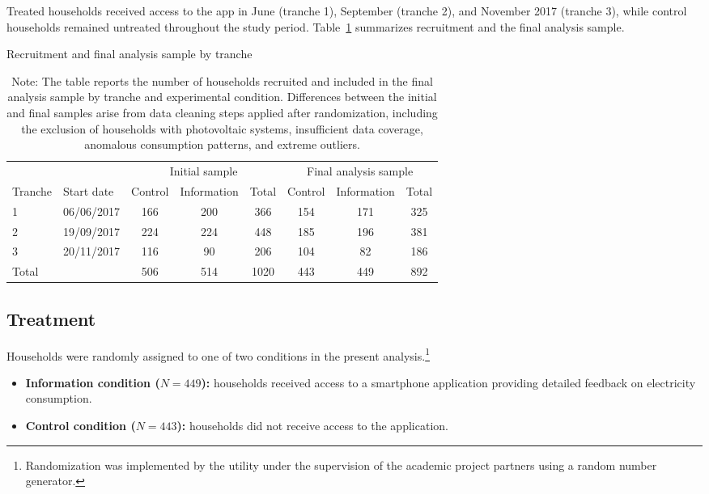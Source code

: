 Treated households received access to the app in June (tranche 1), September (tranche 2), and November 2017 (tranche 3), while control households remained untreated throughout the study period. Table~\ref{tab:recruitment} summarizes recruitment and the final analysis sample.

\begin{table}[H]
\centering
\caption{Recruitment and final analysis sample by tranche}
\label{tab:recruitment}
\begin{tabular}{llcccccc}
\toprule
 &  & \multicolumn{3}{c}{Initial sample} & \multicolumn{3}{c}{Final analysis sample} \\
\cmidrule(lr){3-5} \cmidrule(lr){6-8}
Tranche & Start date & Control & Information & Total & Control & Information & Total \\
\midrule
1 & 06/06/2017 & 166 & 200 & 366 & 154 & 171 & 325 \\
2 & 19/09/2017 & 224 & 224 & 448 & 185 & 196 & 381 \\
3 & 20/11/2017 & 116 & 90  & 206 & 104 & 82  & 186 \\
\midrule
Total &  & 506 & 514 & 1020 & 443 & 449 & 892 \\
\bottomrule
\end{tabular}

\caption*{\footnotesize
Note: The table reports the number of households recruited and included in the final analysis sample by tranche and experimental condition. Differences between the initial and final samples arise from data cleaning steps applied after randomization, including the exclusion of households with photovoltaic systems, insufficient data coverage, anomalous consumption patterns, and extreme outliers.}
\end{table}

\subsection{Treatment}

Households were randomly assigned to one of two conditions in the present analysis.\footnote{Randomization was implemented by the utility under the supervision of the academic project partners using a random number generator.}

\begin{itemize}
    \item \textbf{Information condition ($N = 449$):} households received access to a smartphone application providing detailed feedback on electricity consumption.
    \item \textbf{Control condition ($N = 443$):} households did not receive access to the application.
\end{itemize}

